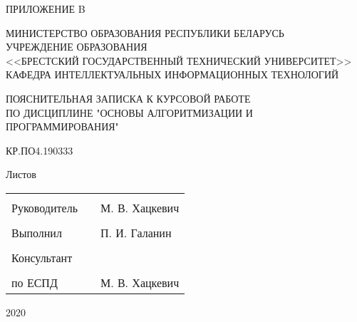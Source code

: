 \documentclass[12pt, a4paper]{article}
\begin{document}
\begin{titlepage}

    \begin{flushright}
        ПРИЛОЖЕНИЕ B
    \end{flushright}

    \vfill

    \begin{center}
        МИНИСТЕРСТВО ОБРАЗОВАНИЯ РЕСПУБЛИКИ БЕЛАРУСЬ\\
        УЧРЕЖДЕНИЕ ОБРАЗОВАНИЯ\\
        <<БРЕСТСКИЙ ГОСУДАРСТВЕННЫЙ ТЕХНИЧЕСКИЙ УНИВЕРСИТЕТ>>\\
        КАФЕДРА ИНТЕЛЛЕКТУАЛЬНЫХ ИНФОРМАЦИОННЫХ ТЕХНОЛОГИЙ\\
    \end{center}

    \vfill

    \begin{center}
        ПОЯСНИТЕЛЬНАЯ ЗАПИСКА К КУРСОВОЙ РАБОТЕ\\
        ПО ДИСЦИПЛИНЕ "ОСНОВЫ АЛГОРИТМИЗАЦИИ И ПРОГРАММИРОВАНИЯ"\\
    \end{center}

    \vfill

    \begin{center}
    КР.ПО4.190333
    \end{center}

    \vfill

    \begin{center}
    Листов \pageref{link:lastPage}
    \end{center}

    \vfill

    \begin{tabular}{ p{5cm} p{5cm} p{5cm}  }
        \multicolumn{3}{c}{}\\
        Руководитель & & М. В. Хацкевич\\
        &&\\
        Выполнил & & П. И. Галанин\\
        &&\\
        Консультант & & \\
        &&\\
        по ЕСПД & & М. В. Хацкевич\\
    \end{tabular}
        
    \vfill

    \begin{center}
        2020
    \end{center}
\end{titlepage}
\newpage
\end{document}
